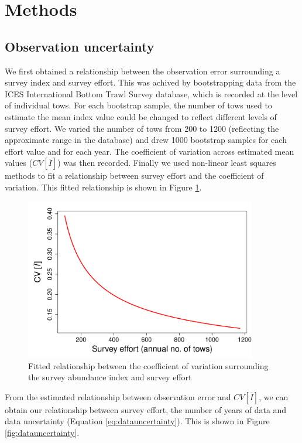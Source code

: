 \documentclass[11pt]{article} %
\begin{document}
\section{Methods}

\subsection{Observation uncertainty}
We first obtained a relationship between the observation error surrounding a survey index and survey effort. This was achived by bootstrapping data from the ICES International Bottom Trawl Survey database, which is recorded at the level of individual tows. For each bootstrap sample, the number of tows used to estimate the mean index value could be changed to reflect different levels of survey effort. We varied the number of tows from 200 to 1200 (reflecting the approximate range in the database) and drew 1000 bootstrap samples for each effort value and for each year. The coefficient of variation across estimated mean values ($CV[\bar{I}]$) was then recorded. Finally we used non-linear least squares methods to fit a relationship between survey effort and the coefficient of variation. This fitted relationship is shown in Figure \ref{fig:obserror}.

\begin{figure}
\includegraphics[width=0.9\textwidth]{../dat/obserror.pdf}
\caption{Fitted relationship between the coefficient of variation surrounding the survey abundance index and survey effort}
\label{fig:obserror}
\end{figure}

From the estimated relationship between observation error and $CV[\bar{I}]$, we can obtain our relationship between survey effort, the number of years of data and data uncertainty (Equation \ref{eq:datauncertainty}). This is shown in Figure \ref{fig:datauncertainty}.
\end{document}
